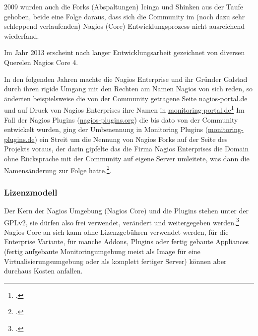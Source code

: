 \documentclass[12pt,a4paper,parskip,listof=totoc,bibliography=totoc]{scrreprt}
\begin{document}
	2009 wurden auch die Forks (Abspaltungen) Icinga und Shinken aus der Taufe gehoben, beide eine Folge daraus, dass sich die Community im (noch dazu sehr schleppend verlaufenden) Nagios (Core) Entwicklungsprozess nicht ausreichend wiederfand.
	
	Im Jahr 2013 erscheint nach langer Entwicklungsarbeit gezeichnet von diversen Querelen Nagios Core 4.
	
	In den folgenden Jahren machte die Nagios Enterprise und ihr Gründer Galstad durch ihren rigide Umgang mit den Rechten am Namen Nagios von sich reden, so änderten beispielsweise die von der Community getragene Seite \url{nagios-portal.de} und  auf Druck von Nagios Enterprises ihre Namen in \url{monitoring-portal.de}\footcite{nagiosportal}  Im Fall der Nagios Plugins (\url{nagios-plugins.org}) die bis dato von der Community entwickelt wurden, ging der Umbenennung in Monitoring Plugins (\url{monitoring-plugins.de})  ein Streit um die Nennung von Nagios Forks auf der Seite des Projekts voraus, der darin gipfelte das die Firma Nagios Enterprises die Domain ohne Rücksprache mit der Community auf eigene Server umleitete, was dann die Namensänderung zur Folge hatte.\footcite{nagiosplugin}.
	
	\subsubsection{Lizenzmodell}
	Der Kern der Nagios Umgebung (Nagios Core) und die Plugins stehen unter der GPLv2, sie dürfen also frei verwendet, verändert und weitergegeben werden.\footcite{gplv2en} Nagios Core an sich kann ohne Lizenzgebühren verwendet werden, für die Enterprise Variante, für manche Addons, Plugins oder fertig gebaute Appliances (fertig aufgebaute Monitoringumgebung meist als Image für eine Virtualisierungsumgebung oder als komplett fertiger Server) können aber durchaus Kosten anfallen.
\end{document}
